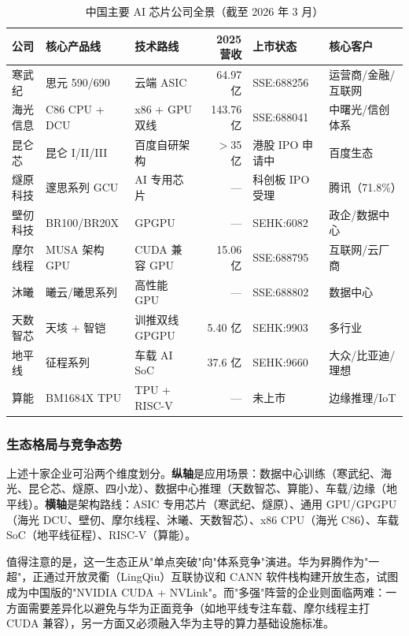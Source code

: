 \begin{table}[htbp]
\centering
\caption{中国主要 AI 芯片公司全景（截至 2026 年 3 月）}
\label{tab:china-ai-chips}
\small
\begin{tabularx}{\textwidth}{@{}l l X r l l@{}}
\toprule
\rowcolor{figLightGray}
\textbf{公司} & \textbf{核心产品线} & \textbf{技术路线} & \textbf{2025 营收} & \textbf{上市状态} & \textbf{核心客户} \\
\midrule
寒武纪 & 思元 590/690 & 云端 ASIC & 64.97 亿 & SSE:688256 & 运营商/金融/互联网 \\
海光信息 & C86 CPU + DCU & x86 + GPU 双线 & 143.76 亿 & SSE:688041 & 中曙光/信创体系 \\
昆仑芯 & 昆仑 I/II/III & 百度自研架构 & $>$35 亿 & 港股 IPO 申请中 & 百度生态 \\
燧原科技 & 邃思系列 GCU & AI 专用芯片 & --- & 科创板 IPO 受理 & 腾讯（71.8\%） \\
壁仞科技 & BR100/BR20X & GPGPU & --- & SEHK:6082 & 政企/数据中心 \\
摩尔线程 & MUSA 架构 GPU & CUDA 兼容 GPU & 15.06 亿 & SSE:688795 & 互联网/云厂商 \\
沐曦 & 曦云/曦思系列 & 高性能 GPU & --- & SSE:688802 & 数据中心 \\
天数智芯 & 天垓 + 智铠 & 训推双线 GPGPU & 5.40 亿 & SEHK:9903 & 多行业 \\
地平线 & 征程系列 & 车载 AI SoC & 37.6 亿 & SEHK:9660 & 大众/比亚迪/理想 \\
算能 & BM1684X TPU & TPU + RISC-V & --- & 未上市 & 边缘推理/IoT \\
\bottomrule
\end{tabularx}
\end{table}


\subsubsection{生态格局与竞争态势}

上述十家企业可沿两个维度划分。\textbf{纵轴}是应用场景：数据中心训练（寒武纪、海光、昆仑芯、燧原、四小龙）、数据中心推理（天数智芯、算能）、车载/边缘（地平线）。\textbf{横轴}是架构路线：ASIC 专用芯片（寒武纪、燧原）、通用 GPU/GPGPU（海光 DCU、壁仞、摩尔线程、沐曦、天数智芯）、x86 CPU（海光 C86）、车载 SoC（地平线征程）、RISC-V（算能）。

值得注意的是，这一生态正从"单点突破"向"体系竞争"演进。华为昇腾作为"一超"，正通过开放灵衢（LingQiu）互联协议和 CANN 软件栈构建开放生态，试图成为中国版的"NVIDIA CUDA + NVLink"。而"多强"阵营的企业则面临两难：一方面需要差异化以避免与华为正面竞争（如地平线专注车载、摩尔线程主打 CUDA 兼容），另一方面又必须融入华为主导的算力基础设施标准。


